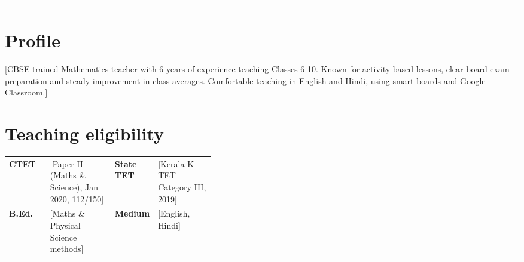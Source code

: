 \documentclass[10pt]{article}
\begin{document}
\fontsize{10.5}{13.2}\selectfont
{\setlength{\fboxrule}{0.4pt}\renewcommand{\arraystretch}{1.1}}\par{\color{accent}\rule{\linewidth}{1.8pt}}\par\vspace{8pt}

\section{Profile}

[CBSE-trained Mathematics teacher with 6 years of experience teaching Classes 6-10. Known for activity-based lessons, clear board-exam preparation and steady improvement in class averages. Comfortable teaching in English and Hindi, using smart boards and Google Classroom.]\par\vspace{4pt}

\section{Teaching eligibility}

\begin{tabularx}{\linewidth}{@{}p{0.2\linewidth}X p{0.2\linewidth}X@{}}
\textbf{CTET} & [Paper II (Maths \& Science), Jan 2020, 112/150] & \textbf{State TET} & [Kerala K-TET Category III, 2019] \\
\textbf{B.Ed.} & [Maths \& Physical Science methods] & \textbf{Medium} & [English, Hindi] \\
\end{tabularx}\par\vspace{2pt}
\end{document}
